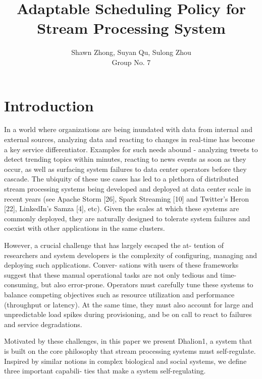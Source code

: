 \documentclass[pdftex,twocolumn,10pt,letterpaper]{article}
\begin{document}
\title{Adaptable Scheduling Policy for Stream Processing System }
\author{
    Shawn Zhong, Suyan Qu, Sulong Zhou \\
    Group No. 7
}
\date{}


\maketitle

\section{Introduction}

In a world where organizations are being inundated with data from internal and external sources, analyzing data and reacting to changes in real-time has become a key service differentiator. Examples for such needs abound - analyzing tweets to detect trending topics within minutes, reacting to news events as soon as they occur, as well as surfacing system failures to data center operators before they cascade.
The ubiquity of these use cases has led to a plethora of distributed stream processing systems being developed and deployed at data center scale in recent years (see Apache Storm [26], Spark Streaming [10] and Twitter’s Heron [22], LinkedIn’s Samza [4], etc). Given the scales at which these systems are commonly deployed, they are naturally designed to tolerate system failures and coexist with other applications in the same clusters.

However, a crucial challenge that has largely escaped the at- tention of researchers and system developers is the complexity of configuring, managing and deploying such applications. Conver- sations with users of these frameworks suggest that these manual operational tasks are not only tedious and time-consuming, but also error-prone. Operators must carefully tune these systems to balance competing objectives such as resource utilization and performance (throughput or latency). At the same time, they must also account for large and unpredictable load spikes during provisioning, and be on call to react to failures and service degradations.


Motivated by these challenges, in this paper we present Dhalion1, a system that is built on the core philosophy that stream processing systems must self-regulate. Inspired by similar notions in complex biological and social systems, we define three important capabili- ties that make a system self-regulating.
\end{document}

